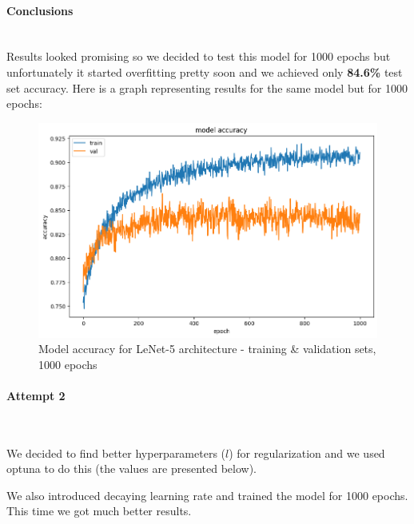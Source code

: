 \documentclass[12pt]{article}
\begin{document}
        \paragraph{Conclusions} \mbox{} \\
          Results looked promising so we decided to test this model for 1000 epochs but unfortunately it
          started overfitting pretty soon and we achieved only \textbf{84.6\%} test set accuracy.
          Here is a graph representing results for the same model but for 1000 epochs:
          \begin{figure}[H]
            \includegraphics[width=\linewidth]{images/lenet1.png}
            \caption{Model accuracy for LeNet-5 architecture - training \& validation sets, 1000 epochs}
            \label{fig:lenet1}
          \end{figure}
        \paragraph{Attempt 2} \mbox{} \\
        \par We decided to find better hyperparameters ($l$) for regularization and
        we used optuna to do this (the values are presented below).
        \par We also introduced decaying learning rate and trained the model for 1000 epochs.
        This time we got much better results.
\end{document}
